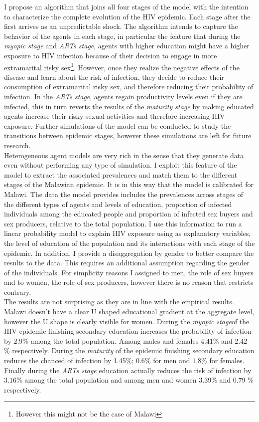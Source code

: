 I propose an algorithm that joins all four stages of the model with the intention to characterize the complete evolution of the HIV epidemic. Each stage after the first arrives as an unpredictable shock. The algorithm intends to capture the behavior of the agents in each stage, in particular the feature that during the \textit{myopic stage} and \textit{ARTs stage}, agents with higher education might have a higher exposure to HIV infection because of their decision to engage in more extramarital risky sex\footnote{However this might not be the case of Malawi}. However, once they realize the negative effects of the disease and learn about the risk of infection, they decide to reduce their consumption of extramarital risky sex, and therefore reducing their probability of infection. In the \textit{ARTs stage}, agents regain productivity levels even if they are infected, this in turn reverts the results of the \textit{maturity stage} by making educated agents increase their risky sexual activities and therefore increasing HIV exposure. Further simulations of the model can be conducted to study the transitions between epidemic stages, however these simulations are left for future research.\\

Heterogeneous agent models are very rich in the sense that they generate data even without performing any type of simulation. I exploit this feature of the model to extract the associated prevalences and match them to the different stages of the Malawian epidemic. It is in this way that the model is calibrated for Malawi. The data the model provides includes the prevalences across stages of the different types of agents and levels of education, proportion of infected individuals among the educated people and proportion of infected sex buyers and sex producers, relative to the total population. I use this information to run a linear probability model to explain HIV exposure using as explanatory variables, the level of education of the population and its interactions with each stage of the epidemic. In addition, I provide a disaggregation by gender to better compare the results to the data. This requires an additional assumption regarding the gender of the individuals. For simplicity reasons I assigned to men, the role of sex buyers and to women, the role of sex producers, however there is no reason that restricts contrary.\\

The results are not surprising as they are in line with the empirical results. Malawi doesn't have a clear U shaped educational gradient at the aggregate level, however the U shape is clearly visible for women. During the \textit{myopic stage}of the HIV epidemic finishing secondary education increases the probability of infection by 2.9${\%}$ among the total population. Among males and females 4.41${\%}$ and 2.42 ${\%}$ respectively. During the \textit{maturity} of the epidemic finishing secondary education reduces the chanced of infection by 1.45$\%$; $0.6\%$ for men and $1.8\%$ for females. Finally during the \textit{ARTs stage} education actually reduces the risk of infection by  3.16${\%}$ among the total population and among men and women 3.39${\%}$ and 0.79 ${\%}$ respectively. 

